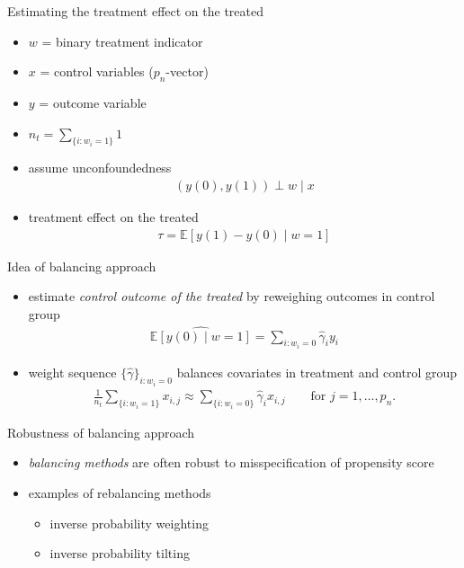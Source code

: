 \documentclass[xcolor=dvipsnames, handout]{beamer}
\newcommand{\E}{\mathbb{E}}
\begin{document}
\begin{frame}{Estimating the treatment effect on the treated}
\begin{itemize}
  \item $w$ = binary treatment indicator
  \item $x$ = control variables ($p_n$-vector)
  \item $y$ = outcome variable  
  \item $n_t = \sum_{\{i: w_i = 1\}} 1$
  \item assume unconfoundedness
  \begin{align*}
    \left( y(0), y(1) \right) \perp w \mid x
  \end{align*}
  \item treatment effect on the treated 
  \begin{align*}
    \tau = \E \left[y(1) - y(0) \mid w = 1\right]
  \end{align*}
\end{itemize}
\end{frame}

\begin{frame}{Idea of balancing approach}
\begin{itemize}
  \item estimate \emph{control outcome of the treated} by reweighing outcomes in control group 
  \begin{align*}
    \widehat{\E[y(0) \mid w = 1]} = \sum_{i: w_i = 0} \hat{\gamma}_i y_i
  \end{align*}
  \item weight sequence $\{\hat{\gamma}\}_{i: w_i = 0}$ balances covariates in treatment and control group
  \begin{align*}
    \frac{1}{n_t} \sum_{\{i: w_i = 1\}} x_{i, j} \approx \sum_{\{i: w_i = 0\}} \hat{\gamma}_i x_{i,j} \qquad \text{for $j = 1, \dotsc, p_n$}.
  \end{align*}
\end{itemize}
\end{frame}

\begin{frame}{Robustness of balancing approach}
\begin{itemize}[<+->]
  \item \emph{balancing methods} are often robust to misspecification of propensity score \parencite{robins1997toward}
  \item examples of rebalancing methods
  \begin{itemize}
    \item inverse probability weighting \parencite{cassel1976some,robins1986new}
    \item inverse probability tilting \parencite{graham2012inverse}
  \end{itemize}
\end{itemize}
\end{frame}
\end{document}

